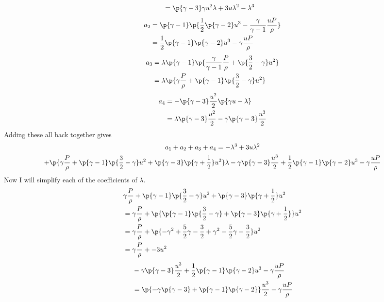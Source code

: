 \documentclass[11pt, oneside]{article}
\begin{document}
\begin{enumerate}
\begin{align*}
      &= \p{\gamma - 3}\gamma u^2 \lambda + 3u \lambda^2 - \lambda^3
    \end{align*}
    \begin{align*}
      a_2 &= \p{\gamma - 1}\p{\frac{1}{2}\p{\gamma - 2} u^3 - \frac{\gamma}{\gamma - 1}\frac{uP}{\rho}} \\
      &= \frac{1}{2}\p{\gamma - 1}\p{\gamma - 2} u^3 - \gamma\frac{uP}{\rho}
    \end{align*}
    \begin{align*}
      a_3 &= \lambda \p{\gamma - 1} \p{\frac{\gamma}{\gamma - 1}\frac{P}{\rho} + \p{\frac{3}{2} - \gamma}u^2} \\
      &= \lambda \p{\gamma\frac{P}{\rho} +\p{\gamma - 1}\p{\frac{3}{2} - \gamma}u^2}
    \end{align*}
    \begin{align*}
      a_4 &= -\p{\gamma - 3} \frac{u^2}{2}\p{\gamma u - \lambda} \\
      &= \lambda\p{\gamma - 3} \frac{u^2}{2} - \gamma \p{\gamma - 3}\frac{u^3}{2}
    \end{align*}
    Adding these all back together gives
    \begin{gather*}
      a_1 + a_2 + a_3 + a_4 = -\lambda^3 + 3u \lambda^2 \\
      + \p{\gamma\frac{P}{\rho} +\p{\gamma - 1}\p{\frac{3}{2} - \gamma}u^2 + \p{\gamma - 3}\p{\gamma + \frac{1}{2}} u^2}\lambda - \gamma \p{\gamma - 3}\frac{u^3}{2} + \frac{1}{2}\p{\gamma - 1}\p{\gamma - 2} u^3 - \gamma\frac{uP}{\rho}
    \end{gather*}
    Now I will simplify each of the coefficients of $\lambda$.
    \begin{align*}
      &\gamma\frac{P}{\rho} +\p{\gamma - 1}\p{\frac{3}{2} - \gamma}u^2 + \p{\gamma - 3}\p{\gamma + \frac{1}{2}}u^2 \\
      &= \gamma\frac{P}{\rho} + \p{\p{\gamma - 1}\p{\frac{3}{2} - \gamma} + \p{\gamma - 3}\p{\gamma + \frac{1}{2}}}u^2 \\
      &= \gamma\frac{P}{\rho} + \p{-\gamma^2 + \frac{5}{2}\gamma - \frac{3}{2} + \gamma^2 - \frac{5}{2}\gamma - \frac{3}{2}}u^2 \\
      &= \gamma\frac{P}{\rho} + -3u^2
    \end{align*}
    \begin{align*}
      &-\gamma \p{\gamma - 3}\frac{u^3}{2} + \frac{1}{2}\p{\gamma - 1}\p{\gamma - 2} u^3 - \gamma\frac{uP}{\rho} \\
      &= \p{-\gamma \p{\gamma - 3} + \p{\gamma - 1}\p{\gamma - 2}} \frac{u^3}{2} - \gamma\frac{uP}{\rho} \\

\end{align*}
\end{enumerate}
\end{document}

